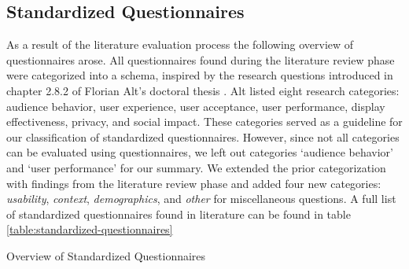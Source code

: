 \subsection{Standardized Questionnaires}
\label{section:questionnaires:categorization}


	As a result of the literature evaluation process the following overview of questionnaires arose. All questionnaires found during the literature review phase were categorized into a schema, inspired by the research questions introduced in chapter 2.8.2 of Florian Alt's doctoral thesis \cite{alt2013thesis}. Alt listed eight research categories: audience behavior, user experience, user acceptance, user performance, display effectiveness, privacy, and social impact. These categories served as a guideline for our classification of standardized questionnaires. However, since not all categories can be evaluated using questionnaires, we left out categories `audience behavior' and `user performance' for our summary. We extended the prior categorization with findings from the literature review phase and added four new categories: \textit{usability}, \textit{context}, \textit{demographics}, and \textit{other} for miscellaneous questions.
	A full list of standardized questionnaires found in literature can be found in table \ref{table:standardized-questionnaires}






		\begin{table}[p]
			\small
			\center
			\begin{adjustwidth}{-2cm}{}
			    
			    \caption[Standardized Questionnaires]{Overview of Standardized Questionnaires}
            \end{adjustwidth}
			\label{table:standardized-questionnaires}
		\end{table}

